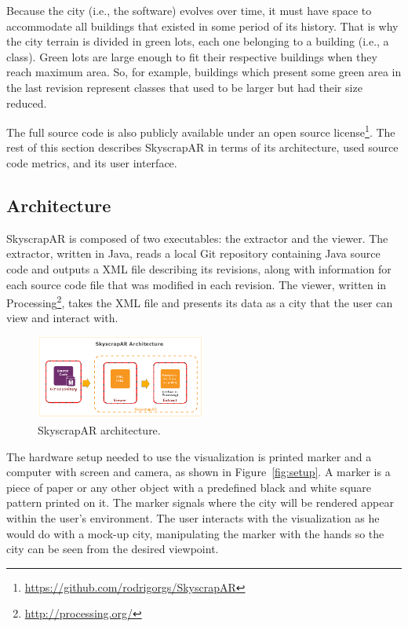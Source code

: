 Because the city (i.e., the software) evolves over time, it must have space to accommodate all buildings that existed in some period of its history. That is why the city terrain is divided in green lots, each one belonging to a building (i.e., a class). Green lots are large enough to fit their respective buildings when they reach maximum area. So, for example, buildings which present some green area in the last revision represent classes that used to be larger but had their size reduced.

The full source code is also publicly available under an open source license\footnote{\url{https://github.com/rodrigorgs/SkyscrapAR}}. The rest of this section describes SkyscrapAR in terms of its architecture, used source code metrics, and its user interface.

\subsection{Architecture} \label{sec:architecture}
SkyscrapAR is composed of two executables: the extractor and the viewer. The extractor, written in Java, reads a local Git repository containing Java source code and outputs a XML file describing its revisions, along with information for each source code file that was modified in each revision. The viewer, written in Processing\footnote{\url{http://processing.org/}}, takes the XML file and presents its data as a city that the user can view and interact with.

\begin{figure}[ht!]
 \centering
 \includegraphics[width=0.5\textwidth, bb=0 0 547 269]{./images/architecture}
 \caption{SkyscrapAR architecture.}
 \label{fig:architecture}
\end{figure}

The hardware setup needed to use the visualization is printed marker and a computer with screen and camera, as shown in Figure~\ref{fig:setup}. A marker is a piece of paper or any other object with a predefined black and white square pattern printed on it. The marker signals where the city will be rendered appear within the user's environment. The user interacts with the visualization as he would do with a mock-up city, manipulating the marker with the hands so the city can be seen from the desired viewpoint.

